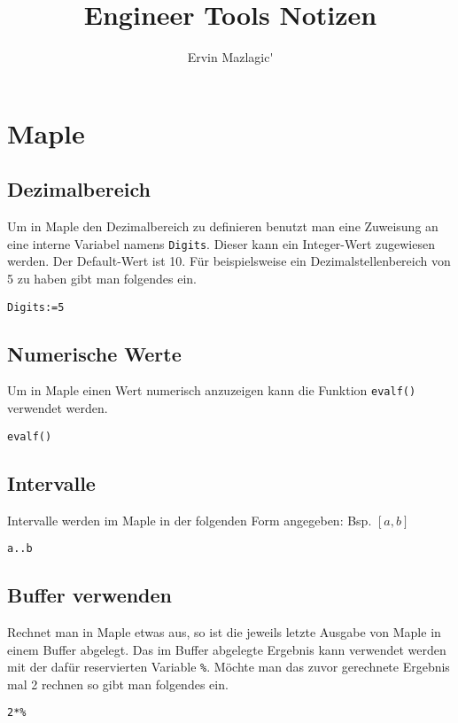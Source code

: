 \documentclass[a4paper,
               10pt,
               fleqn]{article}
\author{Ervin Mazlagic\'}
\title{Engineer Tools Notizen}
\begin{document}
\tableofcontents

\section{Maple}

\subsection{Dezimalbereich}
Um in Maple den Dezimalbereich zu definieren benutzt man eine Zuweisung
an eine interne Variabel namens \verb!Digits!. Dieser kann ein Integer-Wert
zugewiesen werden. Der Default-Wert ist 10. Für beispielsweise ein 
Dezimalstellenbereich von 5 zu haben gibt man folgendes ein.

\begin{lstlisting}[caption=Dezimalstellen, label=Dezimalstellen]
Digits:=5
\end{lstlisting}

\subsection{Numerische Werte}
Um in Maple einen Wert numerisch anzuzeigen kann die Funktion \verb!evalf()!
verwendet werden.

\begin{lstlisting}[caption=Numerisch, label=Numerisch]
evalf()
\end{lstlisting}

\subsection{Intervalle}
Intervalle werden im Maple in der folgenden Form angegeben: Bsp. $[a,b]$

\begin{lstlisting}[caption=Intervalle, label=Intervalle]
a..b
\end{lstlisting}

\subsection{Buffer verwenden}
Rechnet man in Maple etwas aus, so ist die jeweils letzte Ausgabe von
Maple in einem Buffer abgelegt. Das im Buffer abgelegte Ergebnis kann 
verwendet werden mit der dafür reservierten Variable \verb!%!. Möchte man
das zuvor gerechnete Ergebnis mal 2 rechnen so gibt man folgendes ein.

\begin{lstlisting}[caption=Buffer lesen, label=Buffer lesen]
2*%
\end{lstlisting}
\end{document}

